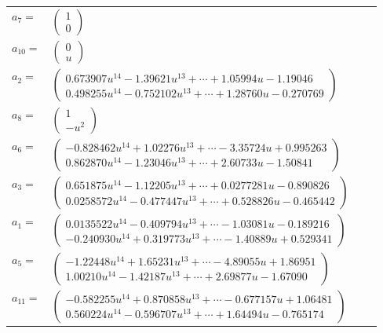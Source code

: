 \documentclass[1p]{elsarticle_modified}
\theoremstyle{definition}
\begin{document}
\begin{tabular}{m{7pt} m{180pt} m{7pt} m{180pt} }
\flushright $a_{7}=$&$\begin{pmatrix}1\\0\end{pmatrix}$ \\
\flushright $a_{10}=$&$\begin{pmatrix}0\\u\end{pmatrix}$ \\
\flushright $a_{2}=$&$\begin{pmatrix}0.673907 u^{14}-1.39621 u^{13}+\cdots+1.05994 u-1.19046\\0.498255 u^{14}-0.752102 u^{13}+\cdots+1.28760 u-0.270769\end{pmatrix}$ \\
\flushright $a_{8}=$&$\begin{pmatrix}1\\- u^2\end{pmatrix}$ \\
\flushright $a_{6}=$&$\begin{pmatrix}-0.828462 u^{14}+1.02276 u^{13}+\cdots-3.35724 u+0.995263\\0.862870 u^{14}-1.23046 u^{13}+\cdots+2.60733 u-1.50841\end{pmatrix}$ \\
\flushright $a_{3}=$&$\begin{pmatrix}0.651875 u^{14}-1.12205 u^{13}+\cdots+0.0277281 u-0.890826\\0.0258572 u^{14}-0.477447 u^{13}+\cdots+0.528826 u-0.465442\end{pmatrix}$ \\
\flushright $a_{1}=$&$\begin{pmatrix}0.0135522 u^{14}-0.409794 u^{13}+\cdots-1.03081 u-0.189216\\-0.240930 u^{14}+0.319773 u^{13}+\cdots-1.40889 u+0.529341\end{pmatrix}$ \\
\flushright $a_{5}=$&$\begin{pmatrix}-1.22448 u^{14}+1.65231 u^{13}+\cdots-4.89055 u+1.86951\\1.00210 u^{14}-1.42187 u^{13}+\cdots+2.69877 u-1.67090\end{pmatrix}$ \\
\flushright $a_{11}=$&$\begin{pmatrix}-0.582255 u^{14}+0.870858 u^{13}+\cdots-0.677157 u+1.06481\\0.560224 u^{14}-0.596707 u^{13}+\cdots+1.64494 u-0.765174\end{pmatrix}$ \\

\end{tabular}
\end{document}
